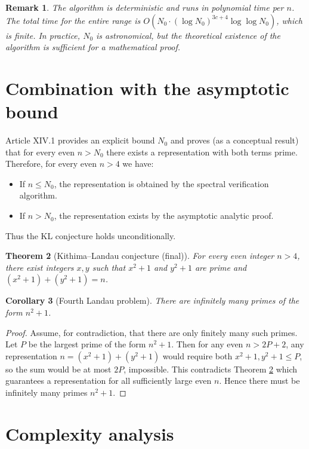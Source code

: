 \documentclass[11pt,a4paper]{article}
\newtheorem{theorem}{Theorem}[section]
\newtheorem{corollary}[theorem]{Corollary}
\newtheorem{remark}[theorem]{Remark}
\begin{document}
\begin{remark}
The algorithm is deterministic and runs in polynomial time per \(n\). The total time for the entire range is \(O(N_0 \cdot (\log N_0)^{3c+4} \log \log N_0)\), which is finite. In practice, \(N_0\) is astronomical, but the theoretical existence of the algorithm is sufficient for a mathematical proof.
\end{remark}

\section{Combination with the asymptotic bound}

Article XIV.1 provides an explicit bound \(N_0\) and proves (as a conceptual result) that for every even \(n > N_0\) there exists a representation with both terms prime. Therefore, for every even \(n > 4\) we have:
\begin{itemize}
\item If \(n \le N_0\), the representation is obtained by the spectral verification algorithm.
\item If \(n > N_0\), the representation exists by the asymptotic analytic proof.
\end{itemize}
Thus the KL conjecture holds unconditionally.

\begin{theorem}[Kithima–Landau conjecture (final)]\label{thm:kl}
For every even integer \(n > 4\), there exist integers \(x,y\) such that \(x^2+1\) and \(y^2+1\) are prime and \((x^2+1)+(y^2+1)=n\).
\end{theorem}

\begin{corollary}[Fourth Landau problem]\label{cor:landau}
There are infinitely many primes of the form \(n^2+1\).
\end{corollary}
\begin{proof}
Assume, for contradiction, that there are only finitely many such primes. Let \(P\) be the largest prime of the form \(n^2+1\). Then for any even \(n > 2P+2\), any representation \(n = (x^2+1)+(y^2+1)\) would require both \(x^2+1, y^2+1 \le P\), so the sum would be at most \(2P\), impossible. This contradicts Theorem \ref{thm:kl} which guarantees a representation for all sufficiently large even \(n\). Hence there must be infinitely many primes \(n^2+1\).
\end{proof}

\section{Complexity analysis}
\end{document}
